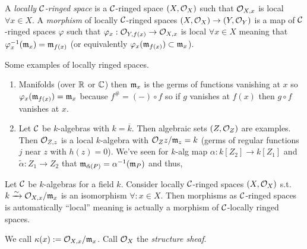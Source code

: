 \documentclass[12pt]{article}
\begin{document}
\begin{defn}
A \textit{locally $\mathcal{C}$-ringed space} is a $\mathcal{C}$-ringed space $(X, \mathcal{O}_{X})$ such that $\mathcal{O}_{X, x}$ is local $\forall x \in X$. A \textit{morphism} of locally $\mathcal{C}$-ringed spaces $(X, \mathcal{O}_{X}) \to (Y, \mathcal{O}_{Y})$ is a map of $\mathcal{C}$-ringed spaces $\varphi$ such that $\varphi_x : \mathcal{O}_{Y, f(x)} \to \mathcal{O}_{X, x}$ is local $\forall x \in X$ meaning that $\varphi_x^{-1}(\mathfrak{m}_x) = \mathfrak{m}_{f(x)}$ (or equivalently $\varphi_x(\mathfrak{m}_{f(x)}) \subset \mathfrak{m}_x$). 
\end{defn}

\begin{example}
Some examples of locally ringed spaces.
\begin{enumerate}
\item Manifolds (over $\mathbb{R}$ or $\mathbb{C}$) then $\mathfrak{m}_x$ is the germs of functions vanishing at $x$ so $\varphi_x(\mathfrak{m}_{f(x)}) = \mathfrak{m}_{x}$ because $f^\# = (-) \circ f$ so if $g$ vanishes at $f(x)$ then $g \circ f$ vanishes at $x$.
\item Let $\mathcal{C}$ be $k$-algebras with $k = \overline{k}$. Then algebraic sets $(Z, \mathcal{O}_{Z})$ are examples. Then $\mathcal{O}_{Z, z}$ is a local $k$-algebra with $\mathcal{O}_{Z}{z} / \mathfrak{m}_z = k$ (germs of regular functions $j$ near $z$ with $h(z) = 0$). We've seen for $k$-alg map $\alpha : k[Z_2] \to k[Z_1]$ and $\tilde{\alpha} : Z_1 \to Z_2$ that $\mathfrak{m}_{\tilde{\alpha}(P)} = \alpha^{-1}(\mathfrak{m}_P)$ and thus,
\begin{center}
\end{center}
\end{enumerate}
\end{example}

\begin{exercise}
Let $\mathcal{C}$ be $k$-algebras for a field $k$. Consider locally $\mathcal{C}$-ringed spaces $(X, \mathcal{O}_{X})$ s.t. $k \xrightarrow{\sim} \mathcal{O}_{X, x}/\mathfrak{m}_x$ is an isomorphism $\forall : x \in X$. Then morphisms as $\mathcal{C}$-ringed spaces is automatically ``local'' meaning is actually a morphism of $\mathcal{C}$-locally ringed spaces.
\end{exercise}

\begin{rmk}
We call $\kappa(x) := \mathcal{O}_{X, x} / \mathfrak{m}_x$. Call $\mathcal{O}_{X}$ the \textit{structure sheaf}.
\end{rmk}
\end{document}
